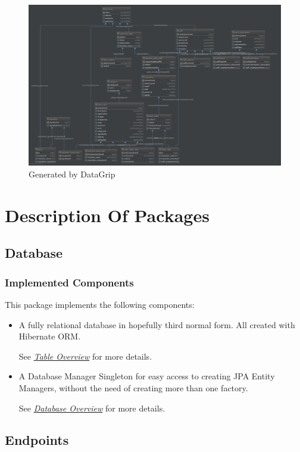 \documentclass[12pt, twoside, a4paper]{report}
\begin{document}
\begin{figure}[H]
  \centering
  \includegraphics[width=15cm]{database.png}
  \caption{Generated by DataGrip}
  \label{fig:data}
\end{figure}

\chapter*{Description Of Packages}
\section*{Database}\label{sec:database}
\subsection*{Implemented Components}
This package implements the following components:
\begin{itemize}
  \item A fully relational database in hopefully third normal form. All created with Hibernate ORM.

    See \textit{\href{run:../JavaDoc/database/tables/package-summary.html}{Table Overview}} for more details.
  \item A Database Manager Singleton for easy access to creating JPA Entity Managers, without the need of creating more than one factory.

    See \textit{\href{run:../JavaDoc/database/package-summary.html}{Database Overview}} for more details.
\end{itemize}

\section*{Endpoints}\label{sec:endpoints}
\end{document}
